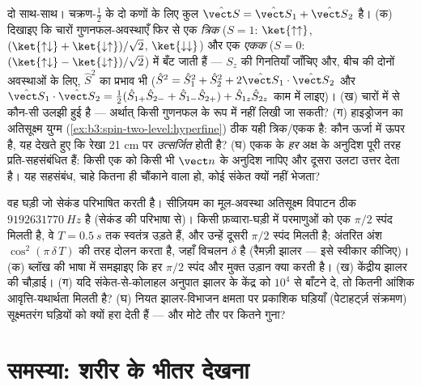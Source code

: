 \begin{exercise}[$\star\star\star$]\label{exo:b3:spin-two-level:11}
दो  साथ-साथ। चक्रण-$\tfrac12$ के दो कणों के लिए कुल
 $\hat{\vect S} = \hat{\vect S}_1 + \hat{\vect S}_2$ है। (क) दिखाइए
कि चारों गुणनफल-अवस्थाएँ फिर से एक \emph{त्रिक} ($S = 1$:
$\ket{\uparrow\uparrow}$, $(\ket{\uparrow\downarrow} +
\ket{\downarrow\uparrow})/\sqrt2$, $\ket{\downarrow\downarrow}$)
और एक \emph{एकक} ($S = 0$: $(\ket{\uparrow\downarrow} -
\ket{\downarrow\uparrow})/\sqrt2$) में बँट जाती हैं --- $S_z$ की
गिनतियाँ जाँचिए और, बीच की दोनों अवस्थाओं के लिए, $\hat S^2$ का प्रभाव
भी ($\hat
S^2 = \hat S_1^2 + \hat S_2^2 + 2\hat{\vect S}_1\cdot\hat{\vect
S}_2$ और $\hat{\vect S}_1\cdot\hat{\vect S}_2 = \tfrac12(\hat
S_{1+}\hat S_{2-} + \hat S_{1-}\hat S_{2+}) + \hat S_{1z}\hat
S_{2z}$ काम में लाइए)। (ख) चारों में से कौन-सी उलझी हुई है ---
अर्थात् किसी गुणनफल के रूप में नहीं लिखी जा सकती? (ग) हाइड्रोजन का
अतिसूक्ष्म युग्म (\cref{ex:b3:spin-two-level:hyperfine}) ठीक यही
त्रिक/एकक है: कौन ऊर्जा में ऊपर है, यह देखते हुए कि रेखा
21 cm पर \emph{उत्सर्जित} होती है? (घ) एकक के  \emph{हर}
अक्ष के अनुदिश पूरी तरह प्रति-सहसंबंधित हैं: किसी एक को किसी भी
$\vect n$ के अनुदिश नापिए और दूसरा उलटा उत्तर देता है। यह
सहसंबंध, चाहे कितना ही चौंकाने वाला हो, कोई संकेत क्यों नहीं भेजता?
\end{exercise}

\begin{exercise}[$\star\star\star$]\label{exo:b3:spin-two-level:12}
वह घड़ी जो सेकंड परिभाषित करती है। सीज़ियम का मूल-अवस्था अतिसूक्ष्म
विपाटन ठीक $\qty{9192631770}{Hz}$ है (सेकंड की परिभाषा से)।
किसी फ़व्वारा-घड़ी में परमाणुओं को एक $\pi/2$ स्पंद मिलती है, वे
$T = \qty{0.5}{s}$ तक स्वतंत्र उड़ते हैं, और उन्हें दूसरी $\pi/2$ स्पंद
मिलती है; अंतरित अंश $\cos^2(\pi\,\delta\,T)$ की तरह दोलन करता है,
जहाँ विचलन $\delta$ है (रैमज़ी झालर --- इसे स्वीकार कीजिए)। (क) ब्लॉख
की भाषा में समझाइए कि हर $\pi/2$ स्पंद और मुक्त उड़ान क्या करती है। (ख)
केंद्रीय झालर की चौड़ाई। (ग) यदि संकेत-से-कोलाहल अनुपात झालर के केंद्र
को $10^4$ से बाँटने दे, तो कितनी आंशिक आवृत्ति-यथार्थता मिलती है? (घ)
नियत झालर-विभाजन क्षमता पर प्रकाशिक घड़ियाँ (पेटाहर्ट्ज़ संक्रमण)
सूक्ष्मतरंग घड़ियों को क्यों हरा देती हैं --- और मोटे तौर पर कितने गुना?
\end{exercise}

\section{समस्या: शरीर के भीतर देखना}

